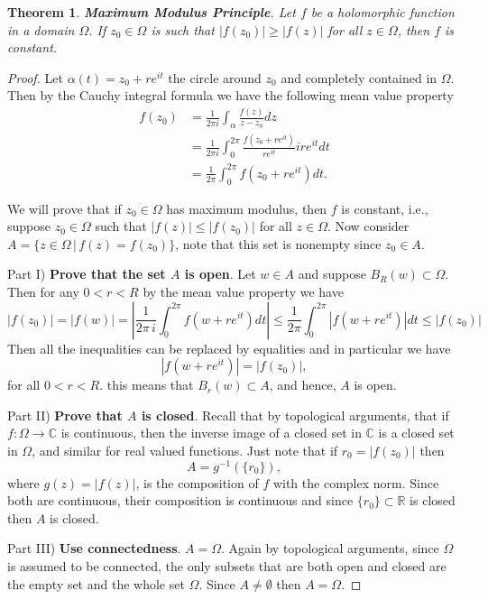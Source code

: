 \documentclass{amsart}
\newtheorem{thm}{Theorem}
\begin{document}
\begin{thm}
\textbf{Maximum Modulus Principle}. Let \(f\) be a holomorphic function in a domain \(\Omega\). If \(z_0\in \Omega\) is such that \(|f(z_0)| \geq |f(z)|\) for all \(z\in \Omega\), then  \(f\) is constant.
\end{thm}
\begin{proof}


Let \(\alpha(t) = z_0 + re^{it}\) the circle around \(z_0\) and completely contained in \(\Omega\). Then by the Cauchy integral formula we have the following mean value property
\begin{align*}
f(z_0) &= \frac{1}{2\pi i} \int_{\alpha} \frac{ f(z)}{z - z_0} dz \\
& = \frac{1}{2\pi i} \int_{0}^{2\pi} \frac{ f(z_0 + re^{it})}{re^{it}} ire^{it}dt \\
& = \frac{1}{2\pi } \int_{0}^{2\pi} f(z_0 + re^{it})dt.
\end{align*}

We will prove that if \(z_0\in \Omega\) has maximum modulus, then \(f\) is constant, i.e.,  suppose \(z_0 \in \Omega\) such that \(|f(z) | \leq |f(z_0)|\) for all \(z\in \Omega\). Now consider \(A = \{ z\in \Omega \, | \, f(z) = f(z_0) \}\), note that this set is nonempty since \(z_0 \in A\).

Part I) \textbf{Prove that the set \(A\)  is open}. Let \(w \in A\) and suppose \(B_R(w) \subset \Omega\). Then for any \(0 < r < R\) by the mean value property we have
\[ |f(z_0)| = |f(w)| = \left|\frac{1}{2\pi\,i}\int_{0}^{2\pi} f(w + re^{it})dt \right| \leq  \frac{1}{2\pi } \int_{0}^{2\pi} \left|f(w + re^{it})\right| dt \leq |f(z_0)| \]
Then all the inequalities can be replaced by equalities and in particular we have
\[ |f(w + re^{it})| = |f(z_0)|,\]
for all \(0 < r < R\). this means that \(B_r(w) \subset A\), and hence, \(A\) is open.

Part II) \textbf{Prove that \(A\) is closed}. Recall that by topological arguments, that if \(f:\Omega \to \mathbb{C}\) is continuous, then the inverse image of a closed set in \(\mathbb{C}\) is a closed set in \(\Omega\), and similar for real valued functions. Just note that if \(r_0 = |f(z_0)|\) then
\[ A = g^{-1}(\{r_0\}), \]
where \(g(z) = |f(z)|\), is the composition of \(f\) with the complex norm. Since both are continuous, their composition is continuous and since \(\{r_0\}\subset\mathbb{R}\) is closed then \(A\) is closed.

Part III) \textbf{Use connectedness}. \(A = \Omega\). Again by topological arguments, since \(\Omega\) is assumed to be connected, the only subsets that are both open and closed are the empty set and the whole set \(\Omega\). Since \(A \neq \emptyset\) then \(A=\Omega\).
\end{proof}
\end{document}
